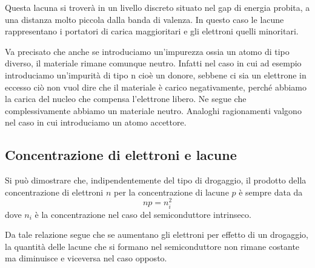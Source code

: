 Questa lacuna si troverà in un livello discreto situato nel gap di energia probita, a una distanza molto piccola dalla banda di valenza. In questo caso le lacune rappresentano i portatori di carica maggioritari e gli elettroni quelli minoritari.

Va precisato che anche se introduciamo un'impurezza ossia un atomo di tipo diverso, il materiale rimane comunque neutro. Infatti nel caso in cui ad esempio introduciamo un'impurità di tipo n cioè un donore, sebbene ci sia un elettrone in eccesso ciò non vuol dire che il materiale è carico negativamente, perché abbiamo la carica del nucleo che compensa l'elettrone libero. Ne segue che complessivamente abbiamo un materiale neutro. Analoghi ragionamenti valgono nel caso in cui introduciamo un atomo accettore.

\subsection{Concentrazione di elettroni e lacune}
Si può dimostrare che, indipendentemente del tipo di drogaggio, il prodotto della concentrazione di elettroni $n$ per la concentrazione di lacune $p$ è sempre data da
\begin{equation*}
   np=n_i^2
\end{equation*}
dove $n_i$ è la concentrazione nel caso del semiconduttore intrinseco.

Da tale relazione segue che se aumentano gli elettroni per effetto di un drogaggio, la quantità delle lacune che si formano nel semiconduttore non rimane costante ma diminuisce e viceversa nel caso opposto. 

